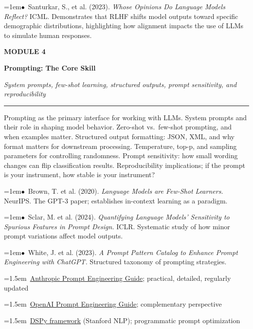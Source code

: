 \documentclass[11pt, a4paper]{article}
\newcommand{\modulehead}[3]{%
  \vspace{0.5em}
  {\small\sffamily\bfseries\textcolor{accent}{MODULE #1}}\par\vspace{-0.3em}
  {\Large\sffamily\bfseries\textcolor{dark}{#2}}\par\vspace{-0.2em}
  {\small\textit{\textcolor{muted}{#3}}}\par
  \vspace{0.2em}\textcolor{bordercol}{\rule{\textwidth}{0.3pt}}\par
}
\newcommand{\seclabel}[1]{%
  \vspace{0.6em}{\normalsize\sffamily\bfseries\textcolor{accent}{#1}}\par\vspace{0.2em}
}
\newcommand{\refpaper}[1]{%
  \par\hangindent=1em\hangafter=1\noindent\textcolor{accent}{\small$\bullet$}~{\small #1}\par
}
\newcommand{\resource}[1]{%
  \par\hangindent=1.5em\hangafter=1\noindent\hspace{0.5em}{\small\textcolor{accent}{\guilsinglright}}~{\small #1}\par
}
\begin{document}
\seclabel{Social Science Applications}

\refpaper{Santurkar, S., et al. (2023). \textit{Whose Opinions Do Language Models Reflect?} ICML. Demonstrates that RLHF shifts model outputs toward specific demographic distributions, highlighting how alignment impacts the use of LLMs to simulate human responses.}

\vspace{1.5em}

\newpage
\modulehead{4}{Prompting: The Core Skill}{System prompts, few-shot learning, structured outputs, prompt sensitivity, and reproducibility}

\seclabel{Core Concepts}

Prompting as the primary interface for working with LLMs. System prompts and their role in shaping model behavior. Zero-shot vs.\ few-shot prompting, and when examples matter. Structured output formatting: JSON, XML, and why format matters for downstream processing. Temperature, top-p, and sampling parameters for controlling randomness. Prompt sensitivity: how small wording changes can flip classification results. Reproducibility implications; if the prompt is your instrument, how stable is your instrument?

\seclabel{Core Readings}

\refpaper{Brown, T. et al. (2020). \textit{Language Models are Few-Shot Learners.} NeurIPS. The GPT-3 paper; establishes in-context learning as a paradigm.}

\refpaper{Sclar, M. et al. (2024). \textit{Quantifying Language Models' Sensitivity to Spurious Features in Prompt Design.} ICLR. Systematic study of how minor prompt variations affect model outputs.}

\refpaper{White, J. et al. (2023). \textit{A Prompt Pattern Catalog to Enhance Prompt Engineering with ChatGPT.} Structured taxonomy of prompting strategies.}

\seclabel{Further Resources}

\resource{\href{https://docs.anthropic.com/en/docs/build-with-claude/prompt-engineering/overview}{Anthropic Prompt Engineering Guide}; practical, detailed, regularly updated}

\resource{\href{https://platform.openai.com/docs/guides/prompt-engineering}{OpenAI Prompt Engineering Guide}; complementary perspective}

\resource{\href{https://github.com/stanfordnlp/dspy}{DSPy framework} (Stanford NLP); programmatic prompt optimization}
\end{document}
